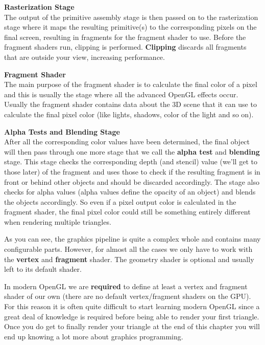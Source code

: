 \begin{center}
    \textbf{Rasterization Stage}\\
    The output of the primitive assembly stage is then passed on to the rasterization stage where it maps the resulting primitive(s) to the corresponding pixels on the final screen, resulting in fragments for the fragment shader to use. Before the fragment shaders run, clipping is performed. \textbf{Clipping} discards all fragments that are outside your view, increasing performance.
\end{center}

\begin{center}
    \textbf{Fragment Shader}\\
    The main purpose of the fragment shader is to calculate the final color of a pixel and this is usually the stage where all the advanced OpenGL effects occur. Usually the fragment shader contains data about the 3D scene that it can use to calculate the final pixel color (like lights, shadows, color of the light and so on).
\end{center}

\begin{center}
    \textbf{Alpha Tests and Blending Stage}\\
    After all the corresponding color values have been determined, the final object will then pass through one more stage that we call the \textbf{alpha test} and \textbf{blending} stage. This stage checks the corresponding depth (and stencil) value (we'll get to those later) of the fragment and uses those to check if the resulting fragment is in front or behind other objects and should be discarded accordingly. The stage also checks for alpha values (alpha values define the opacity of an object) and blends the objects accordingly. So even if a pixel output color is calculated in the fragment shader, the final pixel color could still be something entirely different when rendering multiple triangles.
\end{center}

As you can see, the graphics pipeline is quite a complex whole and contains many configurable parts. However, for almost all the cases we only have to work with the \textbf{vertex} and \textbf{fragment} shader. The geometry shader is optional and usually left to its default shader.

In modern OpenGL we are \textbf{required} to define at least a vertex and fragment shader of our own (there are no default vertex/fragment shaders on the GPU). For this reason it is often quite difficult to start learning modern OpenGL since a great deal of knowledge is required before being able to render your first triangle. Once you do get to finally render your triangle at the end of this chapter you will end up knowing a lot more about graphics programming.

